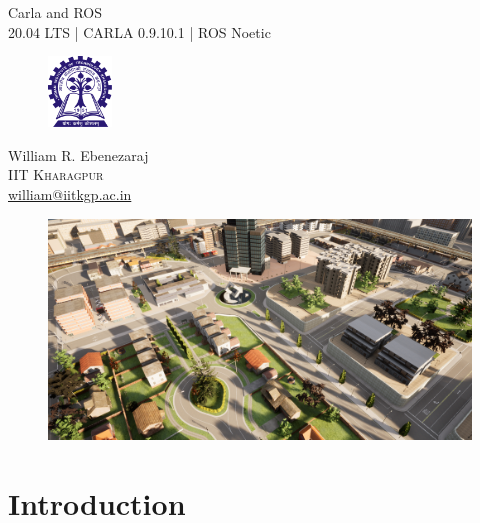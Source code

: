 \documentclass[a4paper,12pt]{report}
\begin{document}
\begin{titlepage}


\vspace*{\fill}
\centering 
{\Huge Carla and ROS}
\vspace{12pt}\\
\small 20.04 LTS | CARLA 0.9.10.1 | ROS Noetic
\vspace*{\fill}\\
\begin{figure}[H]
	\centering
	\includegraphics[width=0.15\textwidth]{images/logo.png}
\end{figure}
\Large William R. Ebenezaraj
\vspace{2pt}\\
\small \textsc{IIT Kharagpur}\\
\href{mailto:william@iitkgp.ac.in}{william@iitkgp.ac.in}
\vspace*{0pt}
\end{titlepage}

\newpage

\tableofcontents
\vfill
\begin{figure}[H]
	\centering
	\includegraphics[width=1\textwidth]{images/CARLA-1.png}
\end{figure}
\vspace*{0pt}

\pagebreak


\section{Introduction}
\end{document}
